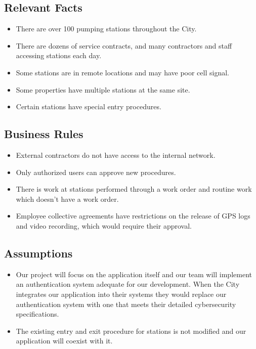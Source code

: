 \documentclass[12pt]{article}
\begin{document}
\subsection{Relevant Facts}
\begin{itemize}
    \item There are over 100 pumping stations throughout the City.
    \item There are dozens of service contracts, and many contractors
    and staff accessing stations each day.
    \item Some stations are in remote locations and may have poor cell signal.
    \item Some properties have multiple stations at the same site.
    \item Certain stations have special entry procedures.
\end{itemize}

\subsection{Business Rules}
\begin{itemize}
    \item External contractors do not have access to the internal network.
    \item Only authorized users can approve new procedures. 
    \item There is work at stations performed through a work order
    and routine work which doesn't have a work order.
    \item Employee collective agreements have restrictions on the release of
    GPS logs and video recording, which would require their approval.
\end{itemize}
\subsection{Assumptions}
\begin{itemize}
    \item Our project will focus on the application itself
    and our team will implement an authentication system adequate for our
    development. When the City integrates our application into their systems 
    they would replace our authentication system with one that meets their 
    detailed cybersecurity specifications.
    \item The existing entry and exit procedure for stations is not modified
    and our application will coexist with it.
\end{itemize}
\end{document}
